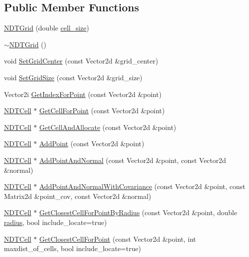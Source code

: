 \subsection*{Public Member Functions}
\begin{DoxyCompactItemize}
\item 
\hyperlink{classNDTGrid_a3b06177c67f897a783b74b07bf520772}{N\+D\+T\+Grid} (double \hyperlink{test__match_8cc_a456553c1fc05d94c07e74c5fd45f6621}{cell\+\_\+size})
\item 
\hyperlink{classNDTGrid_abe32141829ff630aced21234b5dbafd8}{$\sim$\+N\+D\+T\+Grid} ()
\item 
void \hyperlink{classNDTGrid_a4a823b4a67ff79277e0f6faeb34614b9}{Set\+Grid\+Center} (const Vector2d \&grid\+\_\+center)
\item 
void \hyperlink{classNDTGrid_abc68ec18e30d186a1901a48473bba99a}{Set\+Grid\+Size} (const Vector2d \&grid\+\_\+size)
\item 
Vector2i \hyperlink{classNDTGrid_ae9fee8b3dbce19a564f75fc4b9b391da}{Get\+Index\+For\+Point} (const Vector2d \&point)
\item 
\hyperlink{classNDTCell}{N\+D\+T\+Cell} $\ast$ \hyperlink{classNDTGrid_a9f11cfc35c17ac988917c99fad42bb22}{Get\+Cell\+For\+Point} (const Vector2d \&point)
\item 
\hyperlink{classNDTCell}{N\+D\+T\+Cell} $\ast$ \hyperlink{classNDTGrid_aa0343aa6882ed7764815fbd853fc8569}{Get\+Cell\+And\+Allocate} (const Vector2d \&point)
\item 
\hyperlink{classNDTCell}{N\+D\+T\+Cell} $\ast$ \hyperlink{classNDTGrid_a74535af05594018f876cebed80ac2779}{Add\+Point} (const Vector2d \&point)
\item 
\hyperlink{classNDTCell}{N\+D\+T\+Cell} $\ast$ \hyperlink{classNDTGrid_a60a39e286cc87db6b40bd04d5bf75dca}{Add\+Point\+And\+Normal} (const Vector2d \&point, const Vector2d \&normal)
\item 
\hyperlink{classNDTCell}{N\+D\+T\+Cell} $\ast$ \hyperlink{classNDTGrid_ae2d4baff34cfb4d86d9c0b7cdb1985ad}{Add\+Point\+And\+Normal\+With\+Covariance} (const Vector2d \&point, const Matrix2d \&point\+\_\+cov, const Vector2d \&normal)
\item 
\hyperlink{classNDTCell}{N\+D\+T\+Cell} $\ast$ \hyperlink{classNDTGrid_a48ca9fc2739748d16cd03c53139a4ac4}{Get\+Closest\+Cell\+For\+Point\+By\+Radius} (const Vector2d \&point, double \hyperlink{test__match_8cc_a3f67c53b80389c5f53961936edba04c9}{radius}, bool include\+\_\+locate=true)
\item 
\hyperlink{classNDTCell}{N\+D\+T\+Cell} $\ast$ \hyperlink{classNDTGrid_abb5431c2d79d69a0a798930aa83449e1}{Get\+Closest\+Cell\+For\+Point} (const Vector2d \&point, int maxdist\+\_\+of\+\_\+cells, bool include\+\_\+locate=true)

\end{DoxyCompactItemize}
